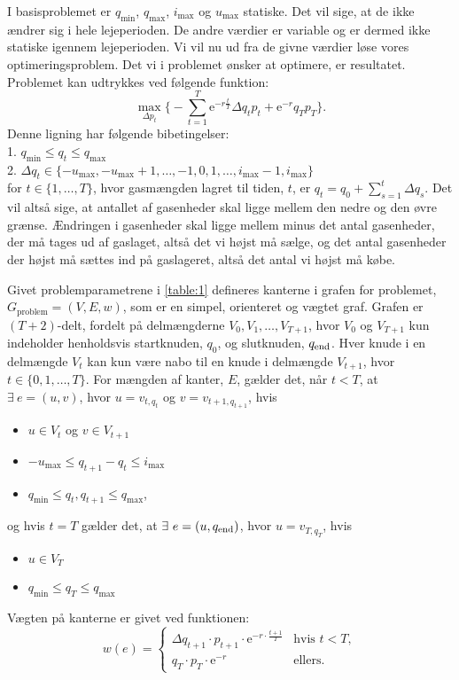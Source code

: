 I basisproblemet er $q_{\min}$, $q_{\max}$, $i_{\max}$ og $u_{\max}$ statiske. Det vil sige, at de ikke ændrer sig i hele lejeperioden. De andre værdier er variable og er dermed ikke statiske igennem lejeperioden. Vi vil nu ud fra de givne værdier løse vores optimeringsproblem. Det vi i problemet ønsker at optimere, er resultatet. Problemet kan udtrykkes ved følgende funktion:
\begin{equation}
\max_{\Delta p_{t}} \Bigg\{ -\sum_{t=1}^{T} \mathrm{e}^{-r\frac{t}{T}} \Delta q_{t} p_{t}+ \mathrm{e}^{-r}q_{T}p_{T} \Bigg\}.
\end{equation}
Denne ligning har følgende bibetingelser:\\
1. $q_{\min} \leq q_{t} \leq q_{\max}$\\
2. $\Delta q_{t} \in \{-u_{\max},-u_{\max}+1,\dotsc,-1,0,1,\dotsc,i_{\max}-1,i_{\max} \}$ \\
for $t \in \{1,\dotsc,T\}$, hvor gasmængden lagret til tiden, $t$, er $q_{t}=q_{0}+\sum_{s=1}^{t} \Delta q_{s}$.
Det vil altså sige, at antallet af gasenheder skal ligge mellem den nedre og den øvre grænse. Ændringen i gasenheder skal ligge mellem minus det antal gasenheder, der må tages ud af gaslaget, altså det vi højst må sælge, og det antal gasenheder der højst må sættes ind på gaslageret, altså det antal vi højst må købe.


\begin{defn}
Givet problemparametrene i \autoref{table:1} defineres kanterne i grafen for problemet, $G_{\textrm{problem}}=(V,E,w)$, som er en simpel, orienteret og vægtet graf. Grafen er $(T+2)$-delt, fordelt på delmængderne $V_0,V_1, \dotsc, V_{T+1}$, hvor $V_0$ og $V_{T+1}$ kun indeholder henholdsvis startknuden, $q_0$, og slutknuden, $q_{\textrm{end}}$. Hver knude i en delmængde $V_t$ kan kun være nabo til en knude i delmængde $V_{t+1}$, hvor $t \in \{0,1, \dotsc,T\}$.
For mængden af kanter, $E$, gælder det, når $t<T$, at $\exists \ e = (u,v)$, hvor $u=v_{t,q_t}$ og $v=v_{t+1, q_{t+1}}$, hvis
	\begin{itemize}
	\item $u \in V_t$ og $v \in V_{t+1}$
	\item $-u_{\max} \leq q_{t+1}-q_t \leq i_{\max}$
	\item $q_{\min} \leq q_t, q_{t+1} \leq q_{\max}$,
	\end{itemize}
og hvis $t=T$ gælder det, at $\exists \ e=(u,q_{\slut})$, hvor $u=v_{T,q_T}$, hvis
	\begin{itemize}
	\item $u \in V_T$
	\item $q_{\min} \leq q_{T} \leq q_{\max}$
	\end{itemize}
Vægten på kanterne er givet ved funktionen:
\begin{equation}
w(e)=
	\begin{cases}
	\Delta q_{t+1} \cdot p_{t+1} \cdot \textrm{e}^{-r \cdot \frac{t+1}{T}} &\text{hvis } t < T, \\
	q_T \cdot p_T \cdot \textrm{e}^{-r} & \text{ellers.}
	\end{cases}
\end{equation}

\end{defn}
